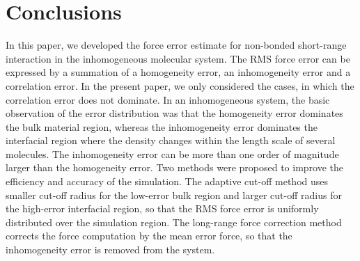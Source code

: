 \documentclass[aps,pre,preprint]{revtex4-1}
\begin{document}
\section{Conclusions}\label{sec:conclusion}

In this paper, we developed the force error estimate for non-bonded
short-range interaction in the inhomogeneous molecular system.  The
RMS force error can be expressed by a summation of a homogeneity
error, an inhomogeneity error and a correlation error. In the present
paper, we only considered the cases, in which the correlation error
does not dominate. In an inhomogeneous system, the basic observation
of the error distribution was that the homogeneity error dominates the
bulk material region, whereas the inhomogeneity error dominates the
interfacial region where the density changes within the length scale
of several molecules. The inhomogeneity error can be more than one
order of magnitude larger than the homogeneity error.  Two methods
were proposed to improve the efficiency and accuracy of the
simulation. The adaptive cut-off method uses smaller cut-off radius
for the low-error bulk region and larger cut-off radius for the
high-error interfacial region, so that the RMS force error is
uniformly distributed over the simulation region. The long-range force
correction method corrects the force computation by the mean error
force, so that the inhomogeneity error is removed from the system.
\end{document}
